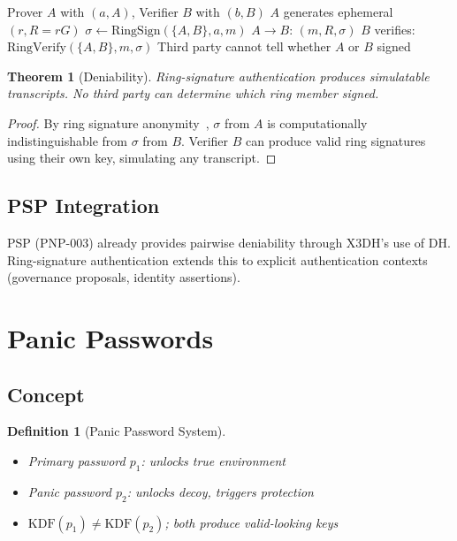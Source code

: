 \documentclass[11pt,a4paper]{article}
\newtheorem{definition}{Definition}[section]
\newtheorem{theorem}{Theorem}[section]
\begin{document}
\begin{algorithm}[H]
\caption{Deniable Authentication}
\label{alg:deniable-auth}
\begin{algorithmic}[1]
\Require Prover $A$ with $(a, A)$, Verifier $B$ with $(b, B)$
\State $A$ generates ephemeral $(r, R = rG)$
\State $\sigma \gets \mathrm{RingSign}(\{A, B\}, a, m)$
\State $A \to B$: $(m, R, \sigma)$
\State $B$ verifies: $\mathrm{RingVerify}(\{A, B\}, m, \sigma)$
\State Third party cannot tell whether $A$ or $B$ signed
\end{algorithmic}
\end{algorithm}

\begin{theorem}[Deniability]
    Ring-signature authentication produces simulatable transcripts.
    No third party can determine which ring member signed.
\end{theorem}

\begin{proof}
    By ring signature anonymity~\cite{rivest2001leak}, $\sigma$ from $A$
    is computationally indistinguishable from $\sigma$ from $B$.  Verifier
    $B$ can produce valid ring signatures using their own key, simulating
    any transcript.
\end{proof}

\subsection{PSP Integration}

PSP (PNP-003) already provides pairwise deniability through X3DH's use
of DH.  Ring-signature authentication extends this to explicit
authentication contexts (governance proposals, identity assertions).

\section{Panic Passwords}
\label{sec:panic}

\subsection{Concept}

\begin{definition}[Panic Password System]
    \begin{itemize}
        \item Primary password $p_1$: unlocks true environment
        \item Panic password $p_2$: unlocks decoy, triggers protection
        \item $\mathrm{KDF}(p_1) \neq \mathrm{KDF}(p_2)$; both produce
        valid-looking keys
    \end{itemize}
\end{definition}
\end{document}
